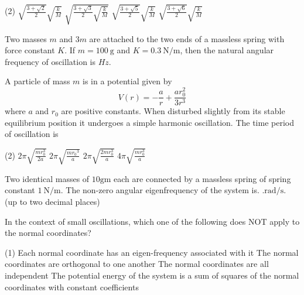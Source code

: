 \begin{enumerate}
\begin{minipage}{\textwidth}
\begin{figure}[H]
	\end{figure}
\end{minipage}
\begin{tasks}(2)
	\task[\textbf{A.}] $\sqrt{\frac{3+\sqrt{2}}{2}} \sqrt{\frac{k}{M}}$
	\task[\textbf{B.}]$\sqrt{\frac{3+\sqrt{3}}{2} \sqrt{\frac{k}{M}}}$
	\task[\textbf{C.}]$\sqrt{\frac{3+\sqrt{5}}{2}} \sqrt{\frac{k}{M}}$
	\task[\textbf{D.}]$\sqrt{\frac{3+\sqrt{6}}{2}} \sqrt{\frac{k}{M}}$
\end{tasks}
\begin{minipage}{\textwidth}
	\item Two masses $m$ and $3 m$ are attached to the two ends of a massless spring with force constant $K$. If $m=100 \mathrm{~g}$ and $K=0.3 \mathrm{~N} / \mathrm{m}$, then the natural angular frequency of oscillation is $H z$.
\end{minipage}
\begin{minipage}{\textwidth}
	\item A particle of mass $m$ is in a potential given by
	$$
	V(r)=-\frac{a}{r}+\frac{a r_{0}^{2}}{3 r^{3}}
	$$
	where $a$ and $r_{0}$ are positive constants. When disturbed slightly from its stable equilibrium position it undergoes a simple harmonic oscillation. The time period of oscillation is
\end{minipage}
\begin{tasks}(2)
	\task[\textbf{A.}] $2 \pi \sqrt{\frac{m r_{0}^{3}}{2 a}}$
	\task[\textbf{B.}]$2 \pi \sqrt{\frac{m r_{0}{ }^{3}}{a}}$
	\task[\textbf{C.}]$2 \pi \sqrt{\frac{2 m r_{0}^{3}}{a}}$
	\task[\textbf{D.}]$4 \pi \sqrt{\frac{m r_{0}^{3}}{a}}$
\end{tasks}
\begin{minipage}{\textwidth}
	\item Two identical masses of $10 \mathrm{gm}$ each are connected by a massless spring of spring constant $1 \mathrm{~N} / \mathrm{m}$. The non-zero angular eigenfrequency of the system is. $. \mathrm{rad} / \mathrm{s} .$ (up to two decimal places)
\end{minipage}
\begin{minipage}{\textwidth}
	\item In the context of small oscillations, which one of the following does NOT apply to the normal coordinates?
\end{minipage}
\begin{tasks}(1)
	\task[\textbf{A.}] Each normal coordinate has an eigen-frequency associated with it
	\task[\textbf{B.}]The normal coordinates are orthogonal to one another
	\task[\textbf{C.}]The normal coordinates are all independent
	\task[\textbf{D.}]The potential energy of the system is a sum of squares of the normal coordinates with constant coefficients
\end{tasks}
\end{enumerate}
